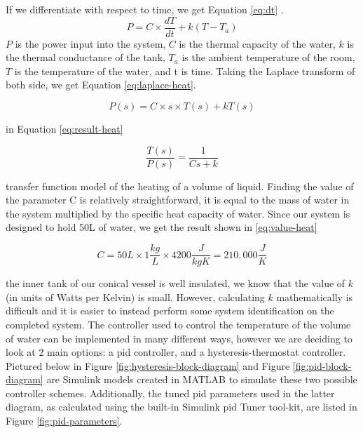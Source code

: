 \documentclass{article}
\begin{document}
If we differentiate with respect to time, we get Equation \ref{eq:dt} \cite{heat-modelling}.
\begin{equation}
P = C \times \frac{dT}{dt} + k(T - T_{a})
\label{eq:dt}
\end{equation}
 $P$ is the power input into the system, $C$ is the thermal capacity of the water, $k$ is the thermal conductance of the tank, $T_{a}$ is the ambient temperature of the room, $T$ is the temperature of the water, and t is time. Taking the Laplace transform of both side, we get Equation \ref{eq:laplace-heat}.

\begin{equation}
P(s) = C \times s \times T(s) + kT(s)
\label{eq:laplace-heat}
\end{equation}

 in Equation \ref{eq:result-heat}

\begin{equation}
\frac{T(s)}{P(s)} = \frac{1}{Cs + k}
\label{eq:result-heat}
\end{equation}

 transfer function model of the heating of a volume of liquid. Finding the value of the parameter C is relatively straightforward, it is equal to the mass of water in the system multiplied by the specific heat capacity of water. Since our system is designed to hold 50L of water, we get the result shown in \ref{eq:value-heat}

\begin{equation}
C = 50L \times 1\frac{kg}{L} \times 4200\frac{J}{kgK} = 210,000\frac{J}{K}
\label{eq:value-heat}
\end{equation}

 the inner tank of our conical vessel is well insulated, we know that the value of $k$ (in units of Watts per Kelvin) is small. However, calculating $k$ mathematically is difficult and it is easier to instead perform some system identification on the completed system.
The controller used to control the temperature of the volume of water can be implemented in many different ways, however we are deciding to look at 2 main options: a \gls{pid} controller, and a hysteresis-thermostat controller. Pictured below in Figure \ref{fig:hysteresis-block-diagram} and Figure \ref{fig:pid-block-diagram} are Simulink models created in MATLAB to simulate these two possible controller schemes. Additionally, the tuned \gls{pid} parameters used in the latter diagram, as calculated using the built-in Simulink \gls{pid} Tuner tool-kit, are listed in Figure \ref{fig:pid-parameters}.
\end{document}
